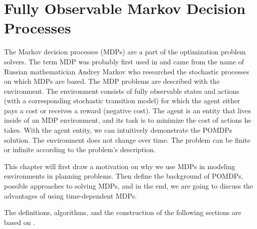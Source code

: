 \chapter{Fully Observable Markov Decision Processes}

The Markov decision processes (MDPs) are a part of the optimization problem solvers. The term MDP was probably first used in \cite{cite:1} and came from the name of Russian mathematician Andrey Markov who researched the stochastic processes on which MDPs are based. The MDP problems are described with the environment. The environment consists of fully observable states and actions (with a corresponding stochastic transition model) for which the agent either pays a cost or receives a reward (negative cost). The agent is an entity that lives inside of an MDP environment, and its task is to minimize the cost of actions he takes. With the agent entity, we can intuitively demonstrate the POMDPs solution. The environment does not change over time. The problem can be finite or infinite according to the problem's description.

This chapter will first draw a motivation on why we use MDPs in modeling environments in planning problems. Then define the background of POMDPs, possible approaches to solving MDPs, and in the end, we are going to discuss the advantages of using time-dependent MDPs.

The definitions, algorithms, and the construction of the following sections are based on \cite{Kolobov2012}. 





